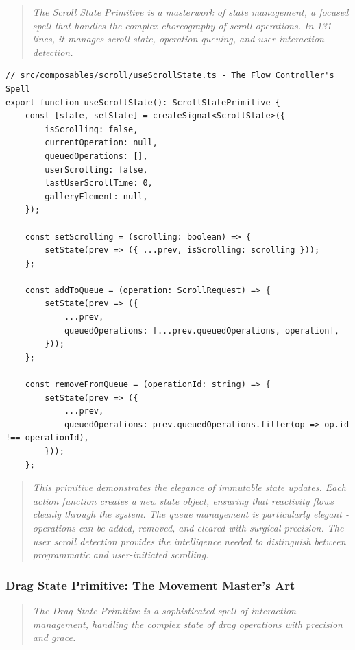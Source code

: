 \documentclass[11pt]{article}
\begin{document}
\begin{quote}
\emph{The Scroll State Primitive is a masterwork of state management, a focused spell that handles the complex choreography of scroll operations. In 131 lines, it manages scroll state, operation queuing, and user interaction detection.}
\end{quote}

\begin{lstlisting}[style=typescript]
// src/composables/scroll/useScrollState.ts - The Flow Controller's Spell
export function useScrollState(): ScrollStatePrimitive {
    const [state, setState] = createSignal<ScrollState>({
        isScrolling: false,
        currentOperation: null,
        queuedOperations: [],
        userScrolling: false,
        lastUserScrollTime: 0,
        galleryElement: null,
    });

    const setScrolling = (scrolling: boolean) => {
        setState(prev => ({ ...prev, isScrolling: scrolling }));
    };

    const addToQueue = (operation: ScrollRequest) => {
        setState(prev => ({
            ...prev,
            queuedOperations: [...prev.queuedOperations, operation],
        }));
    };

    const removeFromQueue = (operationId: string) => {
        setState(prev => ({
            ...prev,
            queuedOperations: prev.queuedOperations.filter(op => op.id !== operationId),
        }));
    };
\end{lstlisting}

\begin{quote}
\emph{This primitive demonstrates the elegance of immutable state updates. Each action function creates a new state object, ensuring that reactivity flows cleanly through the system. The queue management is particularly elegant - operations can be added, removed, and cleared with surgical precision. The user scroll detection provides the intelligence needed to distinguish between programmatic and user-initiated scrolling.}
\end{quote}

\subsubsection{Drag State Primitive: The Movement Master's Art}

\begin{quote}
\emph{The Drag State Primitive is a sophisticated spell of interaction management, handling the complex state of drag operations with precision and grace.}
\end{quote}
\end{document}
